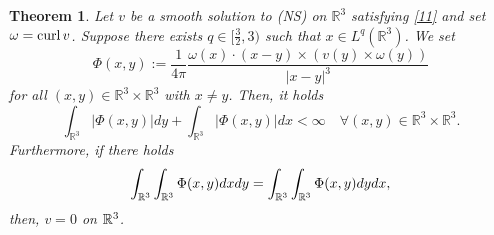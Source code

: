 \documentclass[12pt]{article}
\numberwithin{equation}{section}
\newtheorem{thm}{Theorem}[section]
\theoremstyle{definition}
\begin{document}
\begin{thm}
Let $v$ be a smooth solution to (NS) on $\mathbb{R}^3$ satisfying \eqref{11} and set ${\omega}={\rm curl }\, v$.
Suppose there exists $q \in [\frac{3}{2},3)$ such that $x \in L^q (\mathbb{R}^3)$. We set
\begin{equation}
\Phi(x,y):= \frac{1}{4\pi} \frac{{\omega}(x)\cdot(x-y)\times(v(y)\times {\omega}(y))}{|x-y|^3}\label{1.5}
\end{equation}
for all $(x,y)\in \mathbb{R}^3 \times \mathbb{R}^3$ with $x\neq y$.
Then, it holds
\begin{equation}\label{2.19}
\int_{\mathbb{R}^3} |\Phi(x,y)|dy+\int_{\mathbb{R}^3} |\Phi(x,y)|dx <\infty \quad\forall(x,y)\in \mathbb{R}^3\times\mathbb{R}^3.
\end{equation}
Furthermore, if there holds 
\begin{equation}\label{th13}
\int_{\Bbb R^3}\int_{\Bbb R^3}  \Phi (x,y)dxdy=\int_{\Bbb R^3} \int_{\Bbb R^3} \Phi (x,y)dydx,
\end{equation}
then,  $v=0$ on $\Bbb R^3$.
\end{thm}
\end{document}
